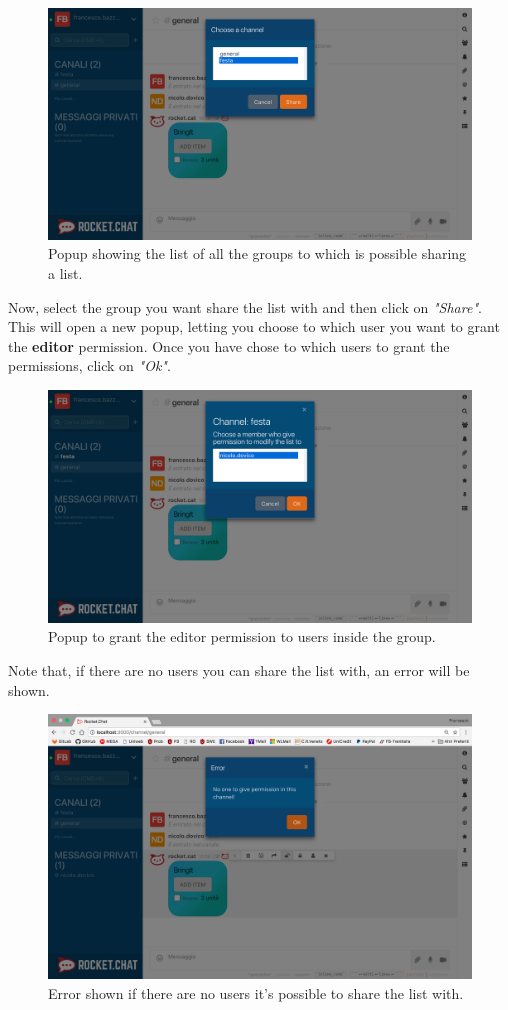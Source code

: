 \begin{figure}[H]
  \centering 
  \includegraphics[width=\textwidth]{Sections/3-HowToUse/Images/share_channel.png}
  \caption{Popup showing the list of all the groups to which is possible sharing a list.}
\end{figure}

Now, select the group you want share the list with and then click on \textit{"Share"}. \\
This will open a new popup, letting you choose to which user you want to grant the \textbf{editor} permission. Once you have chose to which users to grant the permissions, click on \textit{"Ok"}.

\begin{figure}[H]
  \centering 
  \includegraphics[width=\textwidth]{Sections/3-HowToUse/Images/share_user.png}
  \caption{Popup to grant the editor permission to users inside the group.}
\end{figure}

Note that, if there are no users you can share the list with, an error will be shown.

\begin{figure}[H]
  \centering 
  \includegraphics[width=\textwidth]{Sections/3-HowToUse/Images/permission_give_error.png}
  \caption{Error shown if there are no users it's possible to share the list with.}
\end{figure}